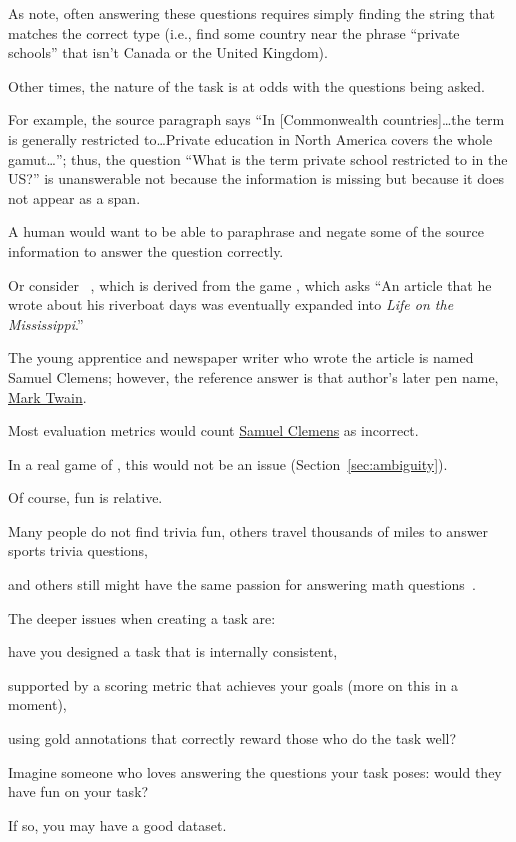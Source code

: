 As  note, often answering these questions requires simply finding the string that matches the correct type (i.e., find some country near the phrase ``private schools'' that isn't Canada or the United Kingdom).

Other times, the nature of the task is at odds with the questions being asked.

For example, the source paragraph says ``In [Commonwealth countries]\dots the term is generally restricted to\dots Private education in North America covers the whole gamut\dots''; thus, the question ``What is the term private school restricted to in the US?'' is unanswerable not because the information is missing but because it does not appear as a span.

A human would want to be able to paraphrase and negate some of the source information to answer the question correctly.

Or consider \searchqa{}~\cite{dunn-17}, which is derived from the game \jeopardy{}, which asks ``An article that he wrote about his riverboat days was eventually expanded into \textit{Life on the Mississippi}.''

The young apprentice and newspaper writer who wrote the article is named Samuel Clemens; however, the reference answer is that author's later pen name, \underline{Mark Twain}.

Most \qa{} evaluation metrics would count \underline{Samuel Clemens} as incorrect.

In a real game of \jeopardy{}, this would not be an issue (Section~\ref{sec:ambiguity}).

Of course, fun is relative.

Many people do not find trivia fun, others travel thousands of miles to answer sports trivia questions,

and others still might have the same passion for answering math questions~\cite{amini-19}.

The deeper issues when creating a  task are:

have you designed a task that is internally consistent,

supported by a scoring metric that achieves your goals (more on this in a moment),

using gold annotations that correctly reward those who do the task well?

Imagine someone who loves answering the questions your task poses: would they have fun on your task?

If so, you may have a good dataset.

